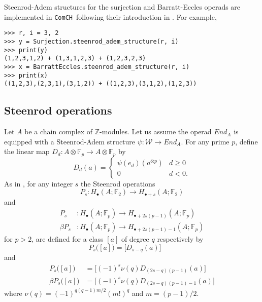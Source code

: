 \documentclass{amsart}
\newcommand{\comch}{\texttt{ComCH}}
\begin{document}
Steenrod-Adem structures for the surjection and Barratt-Eccles operads are implemented in \comch\, following their introduction in \cite{medina2020chain}. For example,

\begin{verbatim}
>>> r, i = 3, 2
>>> y = Surjection.steenrod_adem_structure(r, i)
>>> print(y)
(1,2,3,1,2) + (1,3,1,2,3) + (1,2,3,2,3)
>>> x = BarrattEccles.steenrod_adem_structure(r, i)
>>> print(x)
((1,2,3),(2,3,1),(3,1,2)) + ((1,2,3),(3,1,2),(1,2,3))
\end{verbatim}

\subsection{Steenrod operations}

Let $A$ be a chain complex of $\mathbb Z$-modules. Let us assume the operad $End_A$ is equipped with a Steenrod-Adem structure $\psi \colon \mathcal W \to End_A$. For any prime $p$, define the linear map $D_d \colon A \otimes \mathbb F_p \to A \otimes \mathbb F_p$ by
\begin{equation*}
D_d(a) = \begin{cases}
\psi(e_d)(a^{\otimes p})& d \geq 0 \\
0 & d < 0.
\end{cases}
\end{equation*}
As in \cite{May70algebraic}, for any integer $s$ the Steenrod operations
\begin{equation*}
P_s : H_\bullet(A; \mathbb F_2) \to H_{\bullet + s}(A; \mathbb F_2)
\end{equation*}
and
\begin{align*}
P_s & \colon H_\bullet(A; \mathbb F_p) \to H_{\bullet + 2s(p-1)}(A; \mathbb F_p) \\
\beta P_s & \colon H_\bullet(A; \mathbb F_p) \to H_{\bullet + 2s(p-1) - 1}(A; \mathbb F_p)
\end{align*}
for $p > 2$, are defined for a class $[a]$ of degree $q$ respectively by
\begin{equation*}
P_s\big([a]\big) = \big[D_{s-q}(a)\big] \qquad
\end{equation*}
and
\begin{align*}
P_s\big([a]\big) & = \big[(-1)^s \nu(q) D_{(2s-q)(p-1)}(a)\big] \\
\beta P_s\big([a]\big) & = \big[(-1)^s \nu(q)D_{(2s-q)(p-1)-1}(a)\big]
\end{align*}
where $\nu(q) = (-1)^{q(q-1)m/2}(m!)^q$ and $m = (p-1)/2$.
\end{document}
